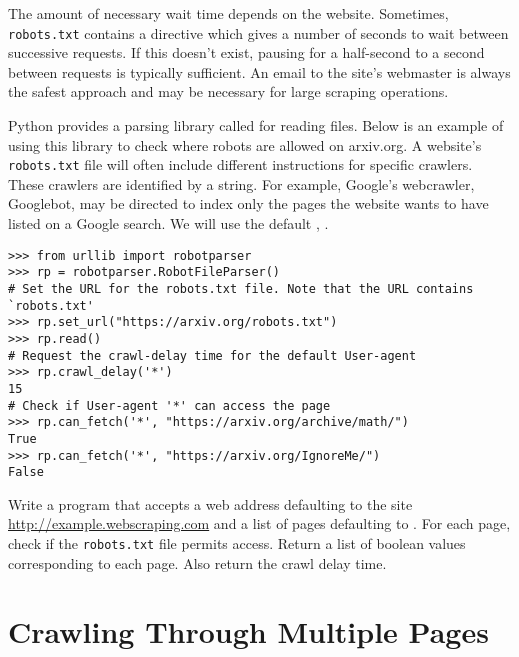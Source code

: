 The amount of necessary wait time depends on the website.
Sometimes, \texttt{robots.txt} contains a  directive which gives a number of seconds to wait between successive requests.
If this doesn't exist, pausing for a half-second to a second between requests is typically sufficient.
An email to the site's webmaster is always the safest approach and may be necessary for large scraping operations.

Python provides a parsing library called  for reading  files.
Below is an example of using this library to check where robots are allowed on arxiv.org.
A website's \texttt{robots.txt} file will often include different instructions for specific crawlers.
These crawlers are identified by a  string.
For example, Google's webcrawler,  Googlebot, may be directed to index only the pages the website wants to have listed on a Google search.
We will use the default , .

\begin{lstlisting}
>>> from urllib import robotparser
>>> rp = robotparser.RobotFileParser()
# Set the URL for the robots.txt file. Note that the URL contains `robots.txt'
>>> rp.set_url("https://arxiv.org/robots.txt")
>>> rp.read()
# Request the crawl-delay time for the default User-agent
>>> rp.crawl_delay('*')
15
# Check if User-agent '*' can access the page
>>> rp.can_fetch('*', "https://arxiv.org/archive/math/")
True
>>> rp.can_fetch('*', "https://arxiv.org/IgnoreMe/")
False
\end{lstlisting}

\begin{problem} %
Write a program that accepts a web address defaulting to the site \url{http://example.webscraping.com} and a list of pages defaulting to .
For each page, check if the \texttt{robots.txt} file permits access.
Return a list of boolean values corresponding to each page.
Also return the crawl delay time.
\label{problem:robots-file}
\end{problem}

\section*{Crawling Through Multiple Pages} %

